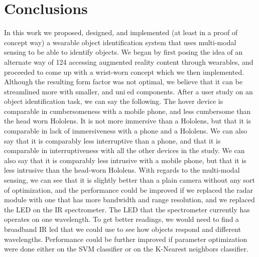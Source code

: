 \section{Conclusions}
In this work we proposed, designed, and implemented (at least in a proof of concept
way) a wearable object identification system that uses multi-modal sensing to be
able to identify objects. We began by first posing the idea of an alternate way of
124
accessing augmented reality content through wearables, and proceeded to come up
with a wrist-worn concept which we then implemented. Although the resulting form
factor was not optimal, we believe that it can be streamlined more with smaller, and
unied components.
After a user study on an object identification task, we can say the following. The hover
device is comparable in cumbersomeness with a mobile phone, and less cumbersome
than the head worn Hololens. It is not more immersive than a Hololens, but that it
is comparable in lack of immersiveness with a phone and a Hololens. We can also
say that it is comparably less interruptive than a phone, and that it is comparable
in interruptiveness with all the other devices in the study. We can also say that it is
comparably less intrusive with a mobile phone, but that it is less intrusive than the
head-worn Hololens.
With regards to the multi-modal sensing, we can see that it is slightly better than
a plain camera without any sort of optimization, and the performance could be improved
if we replaced the radar module with one that has more bandwidth and range
resolution, and we replaced the LED on the IR spectrometer. The LED that the spectrometer
currently has operates on one wavelength. To get better readings, we would
need to find a broadband IR led that we could use to see how objects respond and different
wavelengths. Performance could be further improved if parameter optimization
were done either on the SVM classifier or on the K-Nearest neighbors classifier.

